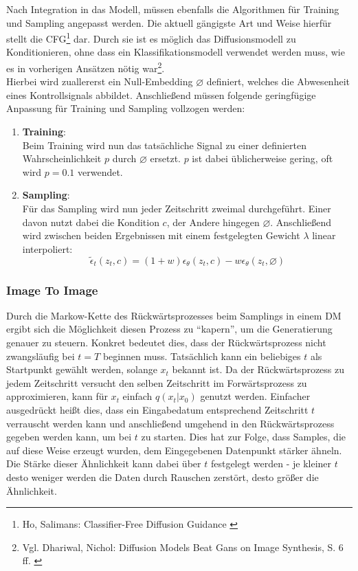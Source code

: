 Nach Integration in das Modell, müssen ebenfalls die Algorithmen für Training und Sampling angepasst werden. Die aktuell gängigste Art und Weise hierfür stellt die \ac{CFG}\footnote{
    Ho, Salimans: Classifier-Free Diffusion Guidance
    \cite{ho2022classifierfreediffusionguidance}
} dar. Durch sie ist es möglich das Diffusionsmodell zu Konditionieren, ohne dass ein Klassifikationsmodell verwendet werden muss, wie es in vorherigen Ansätzen nötig war\footnote{
    Vgl. Dhariwal, Nichol: Diffusion Models Beat Gans on Image Synthesis, S. 6 ff.
    \cite{NEURIPS2021_49ad23d1}
}. \\
Hierbei wird zuallererst ein Null-Embedding $\diameter$ definiert, welches die Abwesenheit eines Kontrollsignals abbildet. Anschließend müssen folgende geringfügige Anpassung für Training und Sampling vollzogen werden:
\begin{enumerate}
    \item \textbf{Training}:\\
    Beim Training wird nun das tatsächliche Signal zu einer definierten Wahrscheinlichkeit $p$ durch $\diameter$ ersetzt. $p$ ist dabei üblicherweise gering, oft wird $p=0.1$ verwendet.
    \item \textbf{Sampling}:\\
    Für das Sampling wird nun jeder Zeitschritt zweimal durchgeführt. Einer davon nutzt dabei die Kondition $c$, der Andere hingegen $\diameter$. Anschließend wird zwischen beiden Ergebnissen mit einem festgelegten Gewicht $\lambda$ linear interpoliert:
    \begin{equation}
        \tilde \epsilon_t(z_t, c) = (1+w)\epsilon_\theta(z_t, c)
        - w\epsilon_\theta(z_t, \diameter)
    \end{equation}
\end{enumerate}

\subsubsection{Image To Image}
\label{subsubsec:i2i}

Durch die Markow-Kette des Rückwärtsprozesses beim Samplings in einem \ac{DM} ergibt sich die Möglichkeit diesen Prozess zu \enquote{kapern}, um die Generatierung genauer zu steuern. Konkret bedeutet dies, dass der Rückwärtsprozess nicht zwangsläufig bei $t=T$ beginnen muss. Tatsächlich kann ein beliebiges $t$ als Startpunkt gewählt werden, solange $x_t$ bekannt ist. Da der Rückwärtsprozess zu jedem Zeitschritt versucht den selben Zeitschritt im Forwärtsprozess zu approximieren, kann für $x_t$ einfach $q(x_t|x_0)$ genutzt werden. Einfacher ausgedrückt heißt dies, dass ein Eingabedatum entsprechend Zeitschritt $t$ verrauscht werden kann und anschließend umgehend in den Rückwärtsprozess gegeben werden kann, um bei $t$ zu starten. Dies hat zur Folge, dass Samples, die auf diese Weise erzeugt wurden, dem Eingegebenen Datenpunkt stärker ähneln. Die Stärke dieser Ähnlichkeit kann dabei über $t$ festgelegt werden - je kleiner $t$ desto weniger werden die Daten durch Rauschen zerstört, desto größer die Ähnlichkeit.



